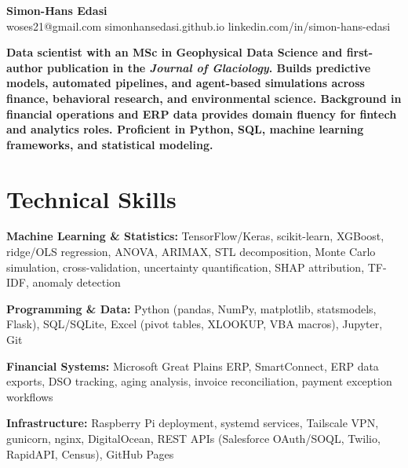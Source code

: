 \documentclass[11pt,a4paper]{article}
\begin{document}
\noindent{}

\begin{center}
    {\LARGE \textbf{Simon-Hans Edasi}} \\[6pt]
    woses21@gmail.com \hfill \textbar \hfill
    simonhansedasi.github.io \hfill \textbar \hfill
    linkedin.com/in/simon-hans-edasi
\end{center}

\vspace{0.3cm}

\noindent
\textbf{Data scientist with an MSc in Geophysical Data Science and first-author publication in the \textit{Journal of Glaciology}. Builds predictive models, automated pipelines, and agent-based simulations across finance, behavioral research, and environmental science. Background in financial operations and ERP data provides domain fluency for fintech and analytics roles. Proficient in Python, SQL, machine learning frameworks, and statistical modeling.}

\section*{Technical Skills}

\noindent
\textbf{Machine Learning \& Statistics:} TensorFlow/Keras, scikit-learn, XGBoost, ridge/OLS regression, ANOVA, ARIMAX, STL decomposition, Monte Carlo simulation, cross-validation, uncertainty quantification, SHAP attribution, TF-IDF, anomaly detection

\noindent
\textbf{Programming \& Data:} Python (pandas, NumPy, matplotlib, statsmodels, Flask), SQL/SQLite, Excel (pivot tables, XLOOKUP, VBA macros), Jupyter, Git

\noindent
\textbf{Financial Systems:} Microsoft Great Plains ERP, SmartConnect, ERP data exports, DSO tracking, aging analysis, invoice reconciliation, payment exception workflows

\noindent
\textbf{Infrastructure:} Raspberry Pi deployment, systemd services, Tailscale VPN, gunicorn, nginx, DigitalOcean, REST APIs (Salesforce OAuth/SOQL, Twilio, RapidAPI, Census), GitHub Pages
\end{document}
